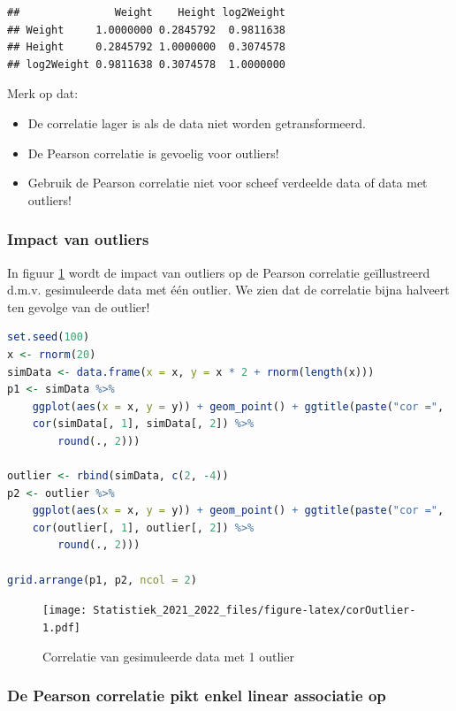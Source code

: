 \documentclass[
  12pt,dutch,coursenotes]{book}
\providecommand{\tightlist}{%
  \setlength{\itemsep}{0pt}\setlength{\parskip}{0pt}}
\theoremstyle{definition}
\theoremstyle{definition}
\theoremstyle{definition}
\theoremstyle{definition}
\theoremstyle{remark}
\begin{document}
\begin{lstlisting}
##               Weight    Height log2Weight
## Weight     1.0000000 0.2845792  0.9811638
## Height     0.2845792 1.0000000  0.3074578
## log2Weight 0.9811638 0.3074578  1.0000000
\end{lstlisting}

Merk op dat:

\begin{itemize}
\tightlist
\item
  De correlatie lager is als de data niet worden getransformeerd.
\item
  De Pearson correlatie is gevoelig voor outliers!
\item
  Gebruik de Pearson correlatie niet voor scheef verdeelde data of data met outliers!
\end{itemize}

\hypertarget{impact-van-outliers}{%
\subsubsection{Impact van outliers}\label{impact-van-outliers}}

In figuur \ref{fig:corOutlier} wordt de impact van outliers op de Pearson correlatie geïllustreerd d.m.v. gesimuleerde data met één outlier. We zien dat de correlatie bijna halveert ten gevolge van de outlier!

\begin{lstlisting}[language=R]
set.seed(100)
x <- rnorm(20)
simData <- data.frame(x = x, y = x * 2 + rnorm(length(x)))
p1 <- simData %>%
    ggplot(aes(x = x, y = y)) + geom_point() + ggtitle(paste("cor =",
    cor(simData[, 1], simData[, 2]) %>%
        round(., 2)))

outlier <- rbind(simData, c(2, -4))
p2 <- outlier %>%
    ggplot(aes(x = x, y = y)) + geom_point() + ggtitle(paste("cor =",
    cor(outlier[, 1], outlier[, 2]) %>%
        round(., 2)))

grid.arrange(p1, p2, ncol = 2)
\end{lstlisting}

\begin{figure}
\centering
\texttt{[image: Statistiek\_2021\_2022\_files/figure-latex/corOutlier-1.pdf]}
\caption{\label{fig:corOutlier}Correlatie van gesimuleerde data met 1 outlier}
\end{figure}

\hypertarget{de-pearson-correlatie-pikt-enkel-linear-associatie-op}{%
\subsubsection{De Pearson correlatie pikt enkel linear associatie op}\label{de-pearson-correlatie-pikt-enkel-linear-associatie-op}}
\end{document}
